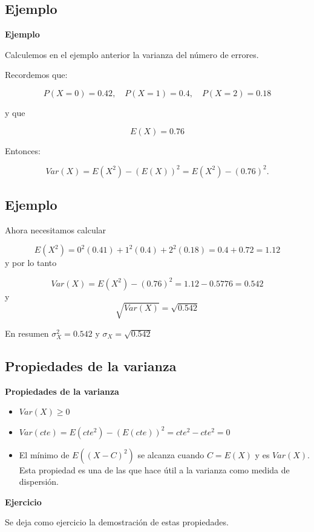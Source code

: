 \documentclass[]{book}
\providecommand{\tightlist}{%
  \setlength{\itemsep}{0pt}\setlength{\parskip}{0pt}}
\begin{document}
\hypertarget{ejemplo-18}{%
\subsection{Ejemplo}\label{ejemplo-18}}

\textbf{Ejemplo}

Calculemos en el ejemplo anterior la varianza del número de errores.

Recordemos que:

\[
P(X=0)=0.42,\quad P(X=1)=0.4, \quad P(X=2)=0.18
\]

y que

\[
E(X)=0.76
\]

Entonces:

\[
Var(X)=E(X^2)-(E(X))^2 = E(X^2)-(0.76)^2.
\]

\hypertarget{ejemplo-19}{%
\subsection{Ejemplo}\label{ejemplo-19}}

Ahora necesitamos calcular

\[E(X^2)= 0^2 (0.41)+ 1^2 (0.4)+ 2^2 (0.18)=0.4+0.72=1.12\]
y por lo tanto

\[Var(X)= E(X^2)-(0.76)^2=1.12-0.5776=0.542\]
y \[\sqrt{Var(X)}=\sqrt{0.542}\]

En resumen \(\sigma_{X}^2=0.542\) y \(\sigma_{X}=\sqrt{0.542}\)

\hypertarget{propiedades-de-la-varianza-1}{%
\subsection{Propiedades de la varianza}\label{propiedades-de-la-varianza-1}}

 \textbf{Propiedades de la varianza}

\begin{itemize}
\tightlist
\item
  \(Var(X)\geq 0\)
\item
  \(Var(cte)=E(cte^2)-(E(cte))^2= cte^2 - cte^2=0\)
\item
  El mínimo de \(E((X-C)^2)\) se alcanza cuando \(C=E(X)\) y es \(Var(X)\). Esta propiedad es una de las que hace útil a la varianza como medida de dispersión.
\end{itemize}

\textbf{Ejercicio}

Se deja como ejercicio la demostración de estas propiedades.
\end{document}
